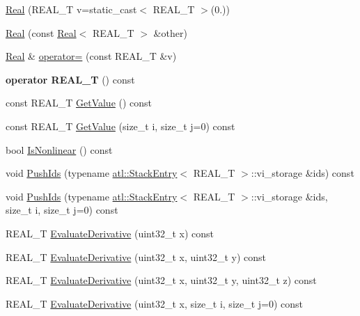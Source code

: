 \begin{DoxyCompactItemize}
\item 
\hyperlink{structatl_1_1_real_a3ef54e5b25ee5800cb9cc3a6702e54c2}{Real} (R\+E\+A\+L\+\_\+\+T v=static\+\_\+cast$<$ R\+E\+A\+L\+\_\+\+T $>$(0.))
\item 
\hyperlink{structatl_1_1_real_abdc6f5cef7138b4699f6405eed513864}{Real} (const \hyperlink{structatl_1_1_real}{Real}$<$ R\+E\+A\+L\+\_\+\+T $>$ \&other)
\item 
\hyperlink{structatl_1_1_real}{Real} \& \hyperlink{structatl_1_1_real_ab0ff33ff7cb2b6b75e69c50e648ae780}{operator=} (const R\+E\+A\+L\+\_\+\+T \&v)
\item 
\hypertarget{structatl_1_1_real_a18df517fb08814575164e6d87cf637bc}{{\bfseries operator R\+E\+A\+L\+\_\+\+T} () const }\label{structatl_1_1_real_a18df517fb08814575164e6d87cf637bc}

\item 
const R\+E\+A\+L\+\_\+\+T \hyperlink{structatl_1_1_real_a2f5cb2f25c49951421acad1bf3acf340}{Get\+Value} () const 
\item 
const R\+E\+A\+L\+\_\+\+T \hyperlink{structatl_1_1_real_a6e8a09189115773e192963fc2a2ade8e}{Get\+Value} (size\+\_\+t i, size\+\_\+t j=0) const 
\item 
bool \hyperlink{structatl_1_1_real_add21737b5353260d88f2e828a44e3379}{Is\+Nonlinear} () const 
\item 
void \hyperlink{structatl_1_1_real_a5cb2b8223c6214ab4e157dd0d7f1a13e}{Push\+Ids} (typename \hyperlink{structatl_1_1_stack_entry}{atl\+::\+Stack\+Entry}$<$ R\+E\+A\+L\+\_\+\+T $>$\+::vi\+\_\+storage \&ids) const 
\item 
void \hyperlink{structatl_1_1_real_ae34aba11b0da584a407b7d02ac6631be}{Push\+Ids} (typename \hyperlink{structatl_1_1_stack_entry}{atl\+::\+Stack\+Entry}$<$ R\+E\+A\+L\+\_\+\+T $>$\+::vi\+\_\+storage \&ids, size\+\_\+t i, size\+\_\+t j=0) const 
\item 
R\+E\+A\+L\+\_\+\+T \hyperlink{structatl_1_1_real_aba08db5acde1f3de89cc5ac4d5c56055}{Evaluate\+Derivative} (uint32\+\_\+t x) const 
\item 
R\+E\+A\+L\+\_\+\+T \hyperlink{structatl_1_1_real_ac066173dcb25893acc9f76b3aca19180}{Evaluate\+Derivative} (uint32\+\_\+t x, uint32\+\_\+t y) const 
\item 
R\+E\+A\+L\+\_\+\+T \hyperlink{structatl_1_1_real_a1815b6e0510f3bf2a3f58f8a8c4191af}{Evaluate\+Derivative} (uint32\+\_\+t x, uint32\+\_\+t y, uint32\+\_\+t z) const 
\item 
R\+E\+A\+L\+\_\+\+T \hyperlink{structatl_1_1_real_a6a94daa6db6842f4df3d4e5072e0cba0}{Evaluate\+Derivative} (uint32\+\_\+t x, size\+\_\+t i, size\+\_\+t j=0) const 

\end{DoxyCompactItemize}
